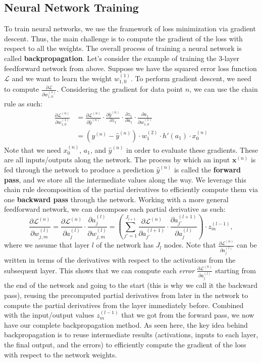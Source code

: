 \documentclass[11pt, letterpaper]{article}
\theoremstyle{definition}
\theoremstyle{plain}
\begin{document}
\subsection{Neural Network Training}
To train neural networks, we use the framework of loss minimization via gradient descent. Thus, the main challenge is to compute the gradient of the loss with respect to all the weights. The overall process of training a neural network is called \textbf{backpropagation}. Let's consider the example of training the 3-layer feedforward network from above. Suppose we have the squared error loss function \(\mathcal{L}\) and we want to learn the weight \(w_{1, 0}^{(1)}\). To perform gradient descent, we need to compute \(\frac{\partial \mathcal{L}}{\partial w_{1, 0}^{(1)}}\). Considering the gradient for data point \(n\), we can use the chain rule as such:
\begin{align*}
\frac{\partial \mathcal{L}^{(n)}}{\partial w_{1, 0}^{(1)}} &=  \frac{\partial \mathcal{L}^{(n)}}{\partial \hat{y}^{(n)}} \cdot \frac{\partial \hat{y}^{(n)}}{\partial z_1} \cdot \frac{\partial z_1}{\partial a_1} \cdot \frac{\partial a_1}{\partial w_{1, 0}^{(1)}} \\
    &=  (y^{(n)} - \hat{y}^{(n)}) \cdot w^{(2)}_1 \cdot h'\left(a_1\right) \cdot x_0^{(n)}
\end{align*}
Note that we need $x_0^{(n)}$, $a_1$, and $\hat{y}^{(n)}$ in order to evaluate these gradients. These are all inputs/outputs along the network. The process by which an input \(\bm{x}^{(n)}\) is fed through the network to produce a prediction $\hat{y}^{(n)}$ is called the \textbf{forward pass}, and we store all the intermediate values along the way. We leverage this chain rule decomposition of the partial derivatives to efficiently compute them via one \textbf{backward pass} through the network. Working with a more general feedforward network, we can decompose each partial derivative as such:
\[\frac{\partial \mathcal{L}^{(n)}}{\partial w_{j, m}^{(l)}} =  \frac{\partial \mathcal{L}^{(n)}}{\partial a_j^{(l)}} \cdot \frac{\partial a_j^{(l)}}{\partial w_{j, m}^{(l)}} = \left(\sum_{j'=1}^{J_{l+1}} \frac{\partial \mathcal{L}^{(n)}}{\partial a_{j'}^{(l+1)}} \cdot \frac{\partial a_{j'}^{(l+1)}}{\partial a_{j}^{(l)}}\right) \cdot z_{m}^{(l-1)},\]
where we assume that layer $l$ of the network has $J_l$ nodes. Note that $\frac{\partial \mathcal{L}^{(n)}}{\partial a_j^{(l)}}$ can be written in terms of the derivatives with respect to the activations from the subsequent layer. This shows that we can compute each \textit{error} $\frac{\partial \mathcal{L}^{(n)}}{\partial a_j^{(l)}}$ starting from the end of the network and going to the start (this is why we call it the backward pass), reusing the precomputed partial derivatives from later in the network to compute the partial derivatives from the layer immediately before. Combined with the input/output values $z_m^{(l-1)}$ that we got from the forward pass, we now have our complete backpropagation method. As seen here, the key idea behind backpropagation is to reuse intermediate results (activations, inputs to each layer, the final output, and the errors) to efficiently compute the gradient of the loss with respect to the network weights.
\end{document}

